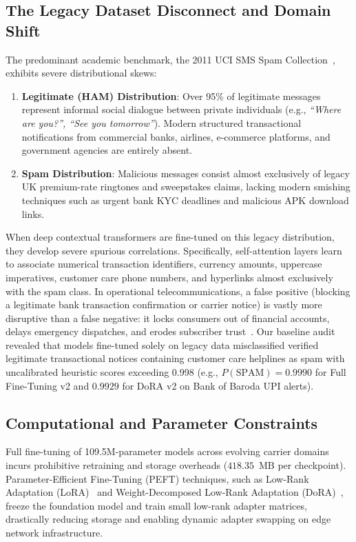 \documentclass[conference]{IEEEtran}
\begin{document}
\subsection{The Legacy Dataset Disconnect and Domain Shift}
The predominant academic benchmark, the 2011 UCI SMS Spam Collection~\cite{almeida2011sms}, exhibits severe distributional skews:
\begin{enumerate}
    \item \textbf{Legitimate (HAM) Distribution}: Over 95\% of legitimate messages represent informal social dialogue between private individuals (e.g., \textit{``Where are you?'', ``See you tomorrow''}). Modern structured transactional notifications from commercial banks, airlines, e-commerce platforms, and government agencies are entirely absent.
    \item \textbf{Spam Distribution}: Malicious messages consist almost exclusively of legacy UK premium-rate ringtones and sweepstakes claims, lacking modern smishing techniques such as urgent bank KYC deadlines and malicious APK download links.
\end{enumerate}

When deep contextual transformers are fine-tuned on this legacy distribution, they develop severe spurious correlations. Specifically, self-attention layers learn to associate numerical transaction identifiers, currency amounts, uppercase imperatives, customer care phone numbers, and hyperlinks almost exclusively with the spam class. In operational telecommunications, a false positive (blocking a legitimate bank transaction confirmation or carrier notice) is vastly more disruptive than a false negative: it locks consumers out of financial accounts, delays emergency dispatches, and erodes subscriber trust~\cite{delany2012sms}. Our baseline audit revealed that models fine-tuned solely on legacy data misclassified verified legitimate transactional notices containing customer care helplines as spam with uncalibrated heuristic scores exceeding 0.998 (e.g., $P(\text{SPAM}) = 0.9990$ for Full Fine-Tuning v2 and $0.9929$ for DoRA v2 on Bank of Baroda UPI alerts).

\subsection{Computational and Parameter Constraints}
Full fine-tuning of 109.5M-parameter models across evolving carrier domains incurs prohibitive retraining and storage overheads ($418.35$~MB per checkpoint). Parameter-Efficient Fine-Tuning (PEFT) techniques, such as Low-Rank Adaptation (LoRA)~\cite{hu2022lora} and Weight-Decomposed Low-Rank Adaptation (DoRA)~\cite{liu2024dora}, freeze the foundation model and train small low-rank adapter matrices, drastically reducing storage and enabling dynamic adapter swapping on edge network infrastructure.
\end{document}
